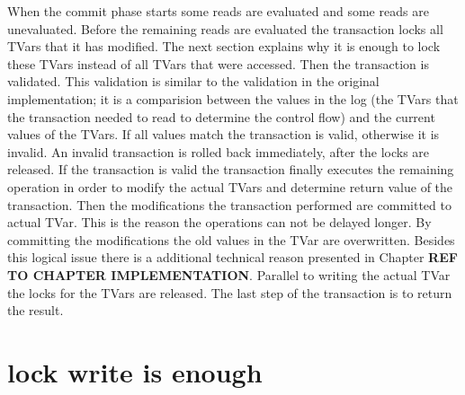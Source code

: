 When the commit phase starts some reads are evaluated and some reads are unevaluated. Before the remaining
reads are evaluated the transaction locks all TVars that it has modified. The next section explains why it 
is enough to lock these TVars instead of all TVars that were accessed. Then the transaction is validated.
This validation is similar to the validation in the original implementation; it is a comparision between
the values in the log (the TVars that the transaction needed to read to determine the control flow) and
the current values of the TVars. If all values match the transaction is valid, otherwise it is invalid.
An invalid transaction is rolled back immediately, after the locks are released. If the transaction is
valid the transaction finally executes the remaining  operation in order to modify the 
actual TVars and determine return value of the transaction. Then the modifications the transaction 
performed are committed to actual TVar. This is the reason the  operations can not 
be delayed longer. By committing the modifications the old values in the TVar are overwritten. Besides 
this logical issue there is a additional technical reason presented in Chapter \textbf{REF TO CHAPTER 
IMPLEMENTATION}.%
Parallel to writing the actual TVar the locks for the TVars are released. The last step of the transaction 
is to return the result. 


\section{lock write is enough}

